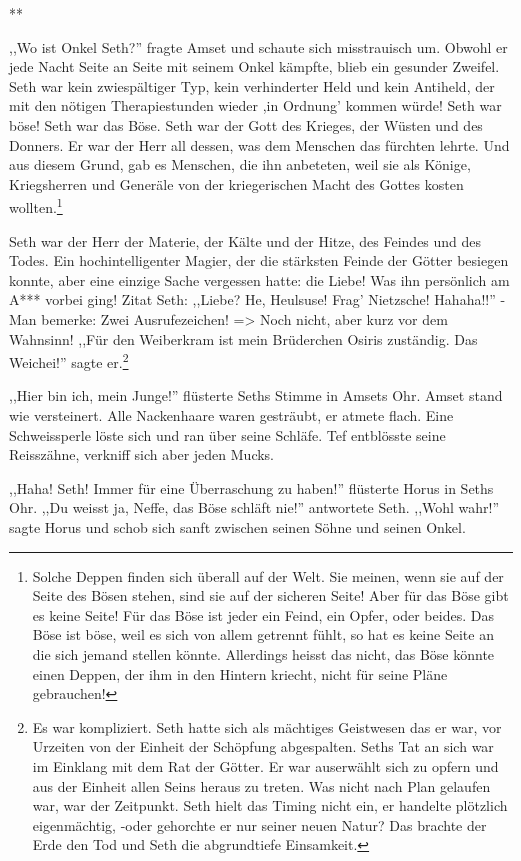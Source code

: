 \documentclass[11pt,titlepage,a5paper]{book}
\newcommand{\sterne}{\par{\centering ***\par}}
\begin{document}
\sterne
 
,,Wo ist Onkel Seth?'' fragte Amset und schaute sich misstrauisch um. Obwohl er jede Nacht Seite an Seite mit seinem Onkel kämpfte, blieb ein gesunder Zweifel. Seth war kein zwiespältiger Typ, kein verhinderter Held und kein Antiheld, der mit den nötigen Therapiestunden wieder ,in Ordnung' kommen würde! Seth war böse! Seth war das Böse. Seth war der Gott des Krieges, der Wüsten und des Donners. Er war der Herr all dessen, was dem Menschen das fürchten lehrte. Und aus diesem Grund, gab es Menschen, die ihn anbeteten, weil sie als Könige, Kriegsherren und Generäle von der kriegerischen Macht des Gottes kosten wollten.\footnote{Solche Deppen finden sich überall auf der Welt. Sie meinen, wenn sie auf der Seite des Bösen stehen, sind sie auf der sicheren Seite! Aber für das Böse gibt es keine Seite! Für das Böse ist jeder ein Feind, ein Opfer, oder beides. Das Böse ist böse, weil es sich von allem getrennt fühlt, so  hat es keine Seite an die sich jemand stellen könnte. Allerdings heisst das nicht, das Böse könnte einen Deppen, der ihm in den Hintern kriecht, nicht für seine Pläne gebrauchen!}

Seth war der Herr der Materie, der Kälte und der Hitze, des Feindes und des Todes. Ein hochintelligenter Magier, der die stärksten Feinde der Götter besiegen konnte, aber eine einzige Sache vergessen hatte: die Liebe! Was ihn persönlich am A*** vorbei ging! Zitat Seth: ,,Liebe? He, Heulsuse! Frag' Nietzsche! Hahaha!!'' -Man bemerke: Zwei Ausrufezeichen! => Noch nicht, aber kurz vor dem Wahnsinn! ,,Für den Weiberkram ist mein Brüderchen Osiris zuständig. Das Weichei!'' sagte er.\footnote{Es war kompliziert. Seth hatte sich als mächtiges Geistwesen das er war, vor Urzeiten von der Einheit der Schöpfung abgespalten. Seths Tat an sich war im Einklang mit dem Rat der Götter. Er war auserwählt sich zu opfern und aus der Einheit allen Seins heraus zu treten. Was nicht nach Plan gelaufen war, war der Zeitpunkt. Seth hielt das Timing nicht ein, er handelte plötzlich eigenmächtig, -oder gehorchte er nur seiner neuen Natur? Das brachte der Erde den Tod und Seth die abgrundtiefe Einsamkeit.} 

,,Hier bin ich, mein Junge!'' flüsterte Seths Stimme in Amsets Ohr. Amset stand wie versteinert. Alle Nackenhaare waren gesträubt, er atmete flach. Eine Schweissperle löste sich und ran über seine Schläfe. Tef entblösste seine Reisszähne, verkniff sich aber jeden Mucks.

,,Haha! Seth! Immer für eine Überraschung zu haben!'' flüsterte Horus in Seths Ohr. ,,Du weisst ja, Neffe, das Böse schläft nie!'' antwortete Seth. ,,Wohl wahr!'' sagte Horus und schob sich sanft zwischen seinen Söhne und seinen Onkel. 
\end{document}
